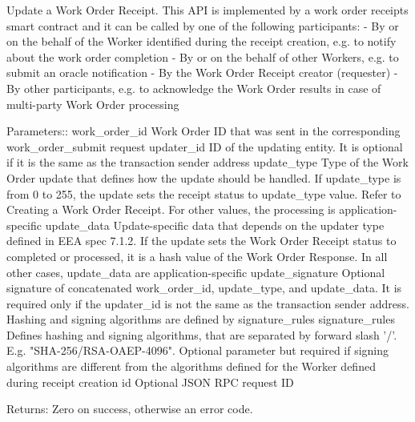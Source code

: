 \begin{DoxyVerb}Update a Work Order Receipt.
This API is implemented by a work order receipts smart contract and it
can be called by one of the following participants:
- By or on the behalf of the Worker identified during the receipt
  creation, e.g. to notify about the work order completion
- By or on the behalf of other Workers, e.g. to submit an oracle
  notification
- By the Work Order Receipt creator (requester)
- By other participants, e.g. to acknowledge the Work Order results
  in case of multi-party Work Order processing

Parameters::
work_order_id    Work Order ID that was sent in the
         corresponding work_order_submit request
updater_id       ID of the updating entity. It is optional if it
         is the same as the transaction sender address
update_type      Type of the Work Order update that defines
         how the update should be handled.
         If update_type is from 0 to 255, the update sets
         the receipt status to update_type value. Refer to
         Creating a Work Order Receipt. For other values,
         the processing is application-specific
update_data      Update-specific data that depends on the
         updater type defined in EEA spec 7.1.2.
         If the update sets the Work Order Receipt status
         to completed or processed, it is a hash value of
         the Work Order Response. In all other
         cases, update_data are application-specific
update_signature Optional signature of concatenated
         work_order_id, update_type, and update_data.
         It is required only if the updater_id is not the
         same as the transaction sender address. Hashing and
         signing algorithms are defined by signature_rules
signature_rules  Defines hashing and signing algorithms,
         that are separated by forward slash '/'.
         E.g. "SHA-256/RSA-OAEP-4096". Optional parameter
         but required if signing algorithms are different
         from the algorithms defined for the Worker defined
         during receipt creation
id               Optional JSON RPC request ID

Returns:
Zero on success, otherwise an error code.
\end{DoxyVerb}
 \mbox{\label{classavalon__sdk_1_1connector_1_1interfaces_1_1work__order__receipt_1_1WorkOrderReceipt_ac5b1f9823491b4b24daa50d146b7ec43}} 
